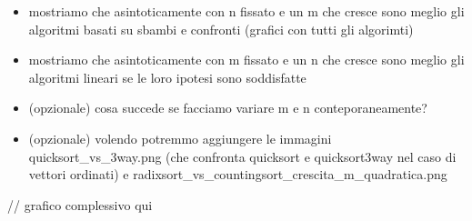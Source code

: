\documentclass[a4paper, 12pt, oneside]{book}
\begin{document}
\begin{itemize}
    \item mostriamo che asintoticamente con n fissato e un m che cresce sono meglio gli algoritmi basati su sbambi e confronti (grafici con tutti gli algorimti)
    \item mostriamo che asintoticamente con m fissato e un n che cresce sono meglio gli algoritmi lineari se le loro ipotesi sono soddisfatte
    \item (opzionale) cosa succede se facciamo variare m e n conteporaneamente?
    \item (opzionale) volendo potremmo aggiungere le immagini quicksort_vs_3way.png (che confronta quicksort e quicksort3way nel caso di vettori ordinati) e radixsort_vs_countingsort_crescita_m_quadratica.png
\end{itemize}

// grafico complessivo qui

\end{document}
